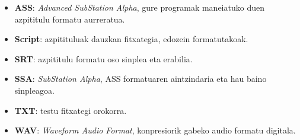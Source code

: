 
\begin{itemize}
\item \textbf{ASS}: \textit{Advanced SubStation Alpha}, gure programak maneiatuko duen azpititulu formatu aurreratua.
\item \textbf{Script}: azpitituluak dauzkan fitxategia, edozein formatutakoak.
\item \textbf{SRT}: azpititulu formatu oso sinplea eta erabilia.
\item \textbf{SSA}: \textit{SubStation Alpha}, ASS formatuaren aintzindaria eta hau baino sinpleagoa.
\item \textbf{TXT}: testu fitxategi orokorra.
\item \textbf{WAV}: \textit{Waveform Audio Format}, konpresiorik gabeko audio formatu digitala.
\end{itemize}
